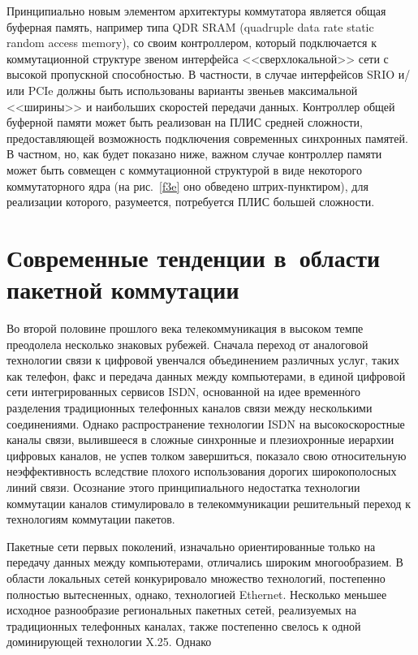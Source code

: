\begin{multicols}{2}
     Принципиально новым элементом архитектуры коммутатора является общая буферная 
память, например типа QDR SRAM (quadruple data rate static random access memory), со своим контроллером, 
который подключается к коммутационной структуре звеном интерфейса 
<<сверхлокальной>> сети с высокой пропускной способностью. В частности, в случае 
интерфейсов SRIO и/или PCIe должны быть использованы варианты звеньев максимальной 
<<ширины>> и наибольших скоростей передачи данных. Контроллер общей буферной 
памяти может быть реализован на ПЛИС средней сложности, предоставляющей 
возможность подключения современных синхронных памятей. В частном, но, как будет 
показано ниже, важном случае контроллер памяти может быть совмещен с коммутационной 
структурой в виде некоторого коммутаторного ядра (на рис.~\ref{f3e} оно обведено 
     штрих-пунктиром), для реализации которого, разумеется, потребуется ПЛИС большей 
сложности.
     

\section{Современные тенденции в~области пакетной коммутации}

\vspace*{-9pt}

     Во второй половине прошлого века телекоммуникация в высоком темпе преодолела 
несколько знаковых рубежей. Сначала переход от аналоговой технологии связи к цифровой 
увенчался объединением различных услуг, таких как телефон, факс и передача данных 
между компьютерами, в единой цифровой сети интегрированных сервисов \mbox{ISDN}, 
основанной на идее временн$\acute{\mbox{о}}$го разделения традиционных телефонных каналов связи между 
несколькими соединениями. Однако распространение технологии ISDN на 
высокоскоростные каналы связи, вылившееся в сложные синхронные и плезиохронные 
иерархии цифровых каналов, не успев толком завершиться, показало свою относительную 
неэффективность вследствие плохого использования дорогих широкополосных линий связи. 
Осознание этого принципиального недостатка технологии коммутации каналов 
стимулировало в телекоммуникации решительный переход к технологиям коммутации 
пакетов.
     
     Пакетные сети первых поколений, изначально ориентированные только на передачу 
данных между компьютерами, отличались широким много\-об\-ра\-зи\-ем. В области локальных 
сетей конкурировало множество технологий, постепенно пол\-ностью вытесненных, однако, 
технологией Ethernet. Несколько меньшее исходное разнообразие региональных пакетных 
сетей, реализуемых на традиционных телефонных каналах, также постепенно свелось к 
одной доминирующей технологии X.25. Однако\linebreak\vspace*{-12pt}
\pagebreak


\end{multicols}
